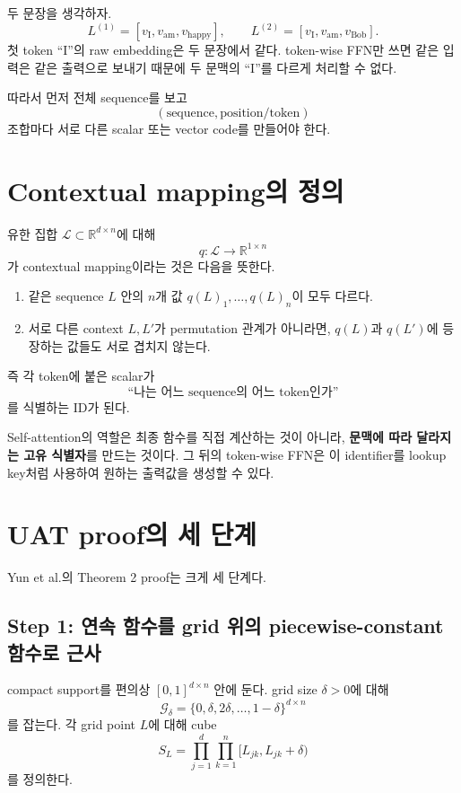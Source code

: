\documentclass[11pt,a4paper,oneside,openany]{memoir}
\newcommand{\R}{\mathbb{R}}
\theoremstyle{definition}
\begin{document}
두 문장을 생각하자.
\[
L^{(1)}=[v_{\mathrm{I}},v_{\mathrm{am}},v_{\mathrm{happy}}],
\qquad
L^{(2)}=[v_{\mathrm{I}},v_{\mathrm{am}},v_{\mathrm{Bob}}].
\]
첫 token ``I''의 raw embedding은 두 문장에서 같다. token-wise FFN만 쓰면 같은 입력은 같은 출력으로 보내기 때문에
두 문맥의 ``I''를 다르게 처리할 수 없다.

따라서 먼저 전체 sequence를 보고
\[
(\text{sequence},\text{position/token})
\]
조합마다 서로 다른 scalar 또는 vector code를 만들어야 한다.

\section{Contextual mapping의 정의}

유한 집합 $\mathcal L\subset\R^{d\times n}$에 대해
\[
q:\mathcal L\to\R^{1\times n}
\]
가 contextual mapping이라는 것은 다음을 뜻한다.

\begin{enumerate}
  \item 같은 sequence $L$ 안의 $n$개 값 $q(L)_1,\dots,q(L)_n$이 모두 다르다.
  \item 서로 다른 context $L,L'$가 permutation 관계가 아니라면, $q(L)$과 $q(L')$에 등장하는 값들도 서로 겹치지 않는다.
\end{enumerate}

즉 각 token에 붙은 scalar가
\[
\text{``나는 어느 sequence의 어느 token인가''}
\]
를 식별하는 ID가 된다.

\begin{keybox}
Self-attention의 역할은 최종 함수를 직접 계산하는 것이 아니라,
\textbf{문맥에 따라 달라지는 고유 식별자}를 만드는 것이다.
그 뒤의 token-wise FFN은 이 identifier를 lookup key처럼 사용하여 원하는 출력값을 생성할 수 있다.
\end{keybox}

\section{UAT proof의 세 단계}

Yun et al.의 Theorem 2 proof는 크게 세 단계다.

\subsection{Step 1: 연속 함수를 grid 위의 piecewise-constant 함수로 근사}

compact support를 편의상 $[0,1]^{d\times n}$ 안에 둔다. grid size $\delta>0$에 대해
\[
\mathcal G_\delta
=
\{0,\delta,2\delta,\dots,1-\delta\}^{d\times n}
\]
를 잡는다.
각 grid point $L$에 대해 cube
\[
S_L
=
\prod_{j=1}^d\prod_{k=1}^n
[L_{jk},L_{jk}+\delta)
\]
를 정의한다.
\end{document}
